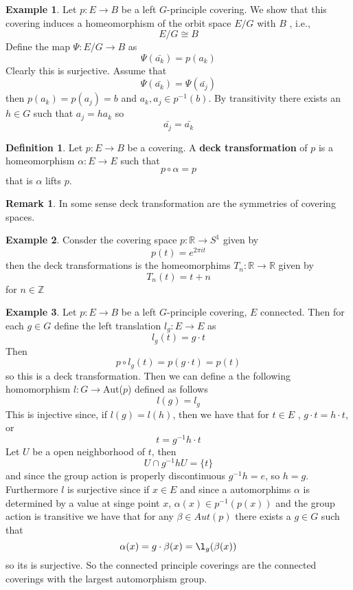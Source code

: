 \documentclass{article}
\theoremstyle{definition}
\newtheorem{exmp}{Example}[section]
\newtheorem{remark}{Remark}
\newtheorem{defn}{Definition}[section]
\newcommand{\Z}{\mathbb{Z}}
\newcommand{\R}{\mathbb{R}}
\begin{document}
\begin{exmp} Let $p: E \rightarrow B$ be a left $G$-principle covering. We show that this covering induces a homeomorphism of the orbit space $E/G$ with $B$ , i.e., $$E/G \cong B$$ Define the map $\Psi: E/G \rightarrow B$ as $$\Psi(\bar{a_k})= p(a_k)$$ Clearly this is surjective. Assume that $$\Psi(\bar{a_k})=\Psi(\bar{a_j})$$ then $p(a_k)=p(a_j)=b$ and $a_k, a_j\in p^{-1}(b)$. By transitivity there exists an $h\in G$ such that $a_j=ha_k$ so $$\bar{a_j}=\bar{a_k}$$ 
\end{exmp}
\begin{defn}
Let $p: E \rightarrow B$ be a covering. A \textbf{deck transformation} of $p$ is a homeomorphism $\alpha: E \rightarrow E$ such that $$p \circ \alpha =p$$ that is $\alpha$ lifts $p$.
\end{defn}
\begin{remark}
In some sense deck transformation are the symmetries of covering spaces.
\end{remark}
\begin{exmp}
Consder the covering space $p:\R\rightarrow S^1$ given by $$p(t)=e^{2\pi i t}$$ then the deck transformations is the homeomorphims $T_n: \R\rightarrow \R$ given by $$T_n(t)=t +n$$ for $n\in \Z$
\end{exmp}
\begin{exmp}
Let $p: E \rightarrow  B$ be a left $G$-principle covering, $E$ connected. Then for each $g \in G$ define the left translation $l_g: E \rightarrow E$ as $$l_g(t)=g\cdot t$$ Then $$p \circ l_g (t)=p(g \cdot t)=p(t) $$ so this is a deck transformation. Then we can define a the following homomorphism $l:G \rightarrow $Aut($p$) defined as follows $$l(g)=l_g$$ This is injective since, if $l(g)=l(h)$, then we have that for $t\in E$ , $g \cdot t=h \cdot t$, or $$t=g^{-1}h\cdot t$$ Let $U$ be a open neighborhood of $t$, then $$U \cap g^{-1}h U= \{t\}$$ and since the group action is properly discontinuous $g^{-1}h=e$, so $h=g$.\\  Furthermore $l$ is surjective since if $x \in E$  and since a automorphims $\alpha$ is determined by a value at singe point $x$, $\alpha(x)\in p^{-1}(p(x))$ and the group action is transitive  we have that for any $\beta \in Aut(p)$ there exists a $g\in G$ such that $$\alpha(x)=g \cdot \beta(x)=\l_g(\beta(x))$$ so its is surjective.  So the connected principle coverings are the connected coverings with the largest  automorphism group.
\end{exmp}
\end{document}

